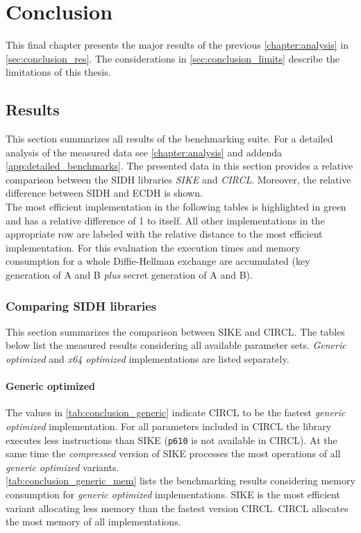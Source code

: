 \chapter{Conclusion}\label{chapter:conclusion}

This final chapter presents the major results of the previous \autoref{chapter:analysis} in \autoref{sec:conclusion_res}. The considerations in \autoref{sec:conclusion_limits} describe the limitations of this thesis.

\section{Results}\label{sec:conclusion_res}

This section summarizes all results of the benchmarking suite. For a detailed analysis of the measured data see \autoref{chapter:analysis} and addenda \ref{app:detailed_benchmarks}. The presented data in this section provides a relative comparison between the \gls{SIDH} libraries \textit{\gls{SIKE}} and \textit{\gls{CIRCL}}. Moreover, the relative difference between \gls{SIDH} and \gls{ECDH} is shown.\\
The most efficient implementation in the following tables is highlighted in green and has a relative difference of 1 to itself. All other implementations in the appropriate row are labeled with the relative distance to the most efficient implementation. For this evaluation the execution times and memory consumption for a whole Diffie-Hellman exchange are accumulated (key generation of A and B \textit{plus} secret generation of A and B).

\subsection{Comparing \gls{SIDH} libraries}
This section summarizes the comparison between \gls{SIKE} and \gls{CIRCL}. The tables below list the measured results considering all available parameter sets. \textit{Generic optimized} and \textit{x64 optimized} implementations are listed separately.

\subsubsection{Generic optimized}
The values in \autoref{tab:conclusion_generic} indicate \gls{CIRCL} to be the fastest \textit{generic optimized} implementation. For all parameters included in \gls{CIRCL} the library executes less instructions than \gls{SIKE} (\texttt{p610} is not available in \gls{CIRCL}). At the same time the \textit{compressed} version of \gls{SIKE} processes the most operations of all \textit{generic optimized} variants.\\
\autoref{tab:conclusion_generic_mem} lists the benchmarking results considering memory consumption for \textit{generic optimized} implementations. \gls{SIKE} is the most efficient variant allocating less memory than the fastest version \gls{CIRCL}. \gls{CIRCL} allocates the most memory of all implementations.


